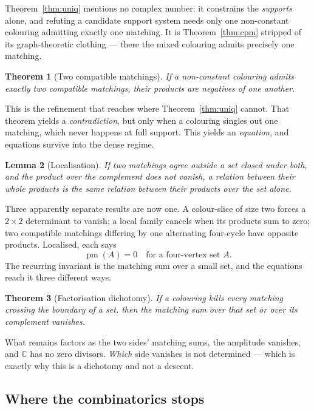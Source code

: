 \documentclass[11pt]{article}
\newtheorem{theorem}{Theorem}[section]
\newtheorem{lemma}[theorem]{Lemma}
\theoremstyle{definition}
\theoremstyle{remark}
\newcommand{\pmS}{\operatorname{pm}}
\begin{document}
\noindent Theorem~\ref{thm:uniq} mentions no complex number: it constrains the
\emph{supports} alone, and refuting a candidate support system needs only one
non-constant colouring admitting exactly one matching. It is Theorem~\ref{thm:cpm}
stripped of its graph-theoretic clothing --- there the mixed colouring admits
precisely one matching.

\begin{theorem}[Two compatible matchings]
If a non-constant colouring admits exactly two compatible matchings, their products
are negatives of one another.
\end{theorem}

\noindent This is the refinement that reaches where Theorem~\ref{thm:uniq} cannot.
That theorem yields a \emph{contradiction}, but only when a colouring singles out
one matching, which never happens at full support. This yields an \emph{equation},
and equations survive into the dense regime.

\begin{lemma}[Localisation]
If two matchings agree outside a set closed under both, and the product over the
complement does not vanish, a relation between their whole products is the same
relation between their products over the set alone.
\end{lemma}

\noindent Three apparently separate results are now one. A colour-slice of size two
forces a $2\times2$ determinant to vanish; a local family cancels when its products
sum to zero; two compatible matchings differing by one alternating four-cycle have
opposite products. Localised, each says
\[
  \pmS(A) = 0 \quad\text{for a four-vertex set } A.
\]
The recurring invariant is the matching sum over a small set, and the equations
reach it three different ways.

\begin{theorem}[Factorisation dichotomy]
If a colouring kills every matching crossing the boundary of a set, then the
matching sum over that set or over its complement vanishes.
\end{theorem}

\noindent What remains factors as the two sides' matching sums, the amplitude
vanishes, and $\mathbb{C}$ has no zero divisors. \emph{Which} side vanishes is not
determined --- which is exactly why this is a dichotomy and not a descent.

\subsection{Where the combinatorics stops}
\end{document}
